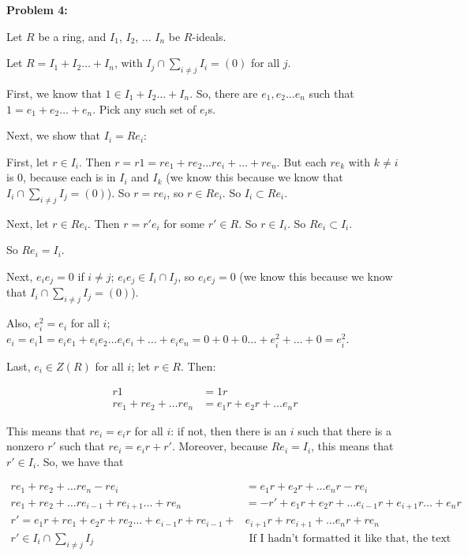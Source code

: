 \documentclass[a4paper,12pt]{article}
\newcommand{\tab}{\hspace{4mm}} %
\begin{document}
{\bf Problem 4:} %

Let $R$ be a ring, and $I_1$, $I_2$, $\ldots$ $I_n$ be $R$-ideals.

Let $R=I_1 + I_2 \ldots +I_n$, with $I_j \cap \sum\limits_{i \neq j} I_i = (0)$ for all $j$.

\tab First, we know that $1 \in I_1 + I_2 \ldots +I_n$. So, there are $e_1, e_2 \ldots e_n$ such that $1 = e_1 + e_2 \ldots + e_n$. Pick any such set of $e_i$s.

\tab Next, we show that $I_i = Re_i$:

\tab \tab First, let $r \in I_i$. Then $r=r1=re_1+re_2 \ldots re_i + \ldots +re_n$. But each $re_k$ with $k \neq i$ is $0$, because each is in $I_i$ and $I_k$ (we know this because we know that $I_i \cap \sum\limits_{i \neq j} I_j = (0)$). So $r = re_i$, so $r \in Re_i$. So $I_i \subset Re_i$.

\tab \tab Next, let $r \in Re_i$. Then $r = r'e_i$ for some $r' \in R$. So $r \in I_i$. So $Re_i \subset I_i$.

\tab \tab So $Re_i = I_i$.

\tab Next, $e_ie_j = 0$ if $i \neq j$; $e_ie_j \in I_i \cap I_j$, so $e_ie_j = 0$ (we know this because we know that $I_i \cap \sum\limits_{i \neq j} I_j = (0)$).

\tab Also, $e_i^2 = e_i$ for all $i$; $e_i = e_i1= e_ie_1+e_ie_2 \ldots e_ie_i +\ldots + e_ie_n = 0+0+0\ldots+e_i^2+\ldots+0 = e_i^2$. 

\tab Last, $e_i \in Z(R)$ for all $i$; let $r \in R$. Then:

\begin{align*}
r1&=1r\\
re_1+re_2+\ldots re_n &=e_1r+e_2r+\ldots e_nr
\end{align*}

\tab This means that $re_i=e_ir$ for all $i$: if not, then there is an $i$ such that there is a nonzero $r'$ such that $re_i = e_ir + r'$. Moreover, because $Re_i=I_i$, this means that $r' \in I_i$. So, we have that

\begin{align*}
re_1+re_2+\ldots re_n -re_i &=e_1r+e_2r+\ldots e_nr - re_i\\
re_1+re_2+\ldots re_{i-1} + re_{i+1} \ldots +re_n &= -r' + e_1r+e_2r+\ldots e_{i-1}r + e_{i+1}r \ldots +e_nr\\
r' = e_1r + re_1 + e_2r + re_2 \ldots + e_{i-1}r + re_{i-1} + &e_{i+1}r + re_{i+1} + \ldots e_nr + re_n\\
r' \in I_i \cap \sum\limits_{i \neq j} I_j &\text{ If I hadn't formatted it like that, the text would run off the page}
\end{align*}
\end{document}
